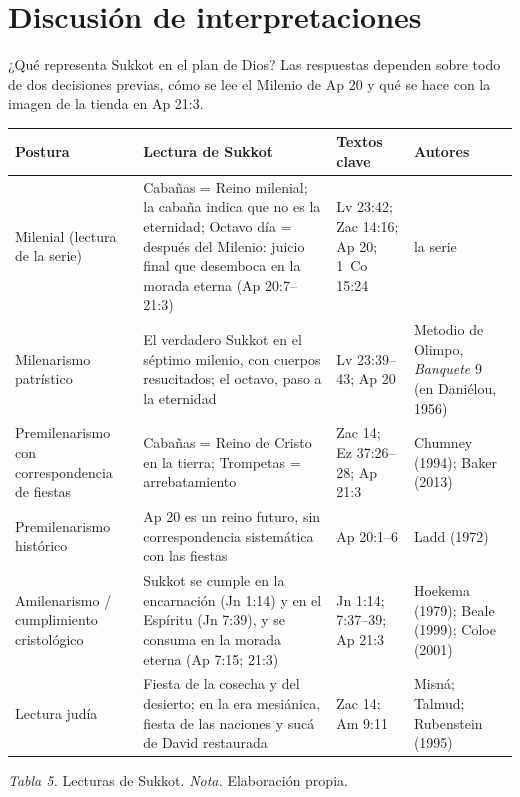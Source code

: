 \documentclass[11pt,letterpaper]{article}
\begin{document}
\section{Discusión de interpretaciones}

¿Qué representa Sukkot en el plan de Dios? Las respuestas dependen sobre todo de dos decisiones previas, cómo se lee el Milenio de Ap 20 y qué se hace con la imagen de la tienda en Ap 21:3.

\begin{center}\small\renewcommand{\arraystretch}{1.22}
\begin{tabular}{@{}L{3.0cm}L{5.2cm}L{3.2cm}L{3.0cm}@{}}
\toprule
\textbf{Postura} & \textbf{Lectura de Sukkot} & \textbf{Textos clave} & \textbf{Autores} \\ \midrule
Milenial (lectura de la serie) & Cabañas = Reino milenial; la cabaña indica que no es la eternidad; Octavo día = después del Milenio: juicio final que desemboca en la morada eterna (Ap 20:7--21:3) & Lv 23:42; Zac 14:16; Ap 20; 1~Co 15:24 & la serie \\
Milenarismo patrístico & El verdadero Sukkot en el séptimo milenio, con cuerpos resucitados; el octavo, paso a la eternidad & Lv 23:39--43; Ap 20 & Metodio de Olimpo, \emph{Banquete} 9 (en Daniélou, 1956) \\
Premilenarismo con correspondencia de fiestas & Cabañas = Reino de Cristo en la tierra; Trompetas = arrebatamiento & Zac 14; Ez 37:26--28; Ap 21:3 & Chumney (1994); Baker (2013) \\
Premilenarismo histórico & Ap 20 es un reino futuro, sin correspondencia sistemática con las fiestas & Ap 20:1--6 & Ladd (1972) \\
Amilenarismo / cumplimiento cristológico & Sukkot se cumple en la encarnación (Jn 1:14) y en el Espíritu (Jn 7:39), y se consuma en la morada eterna (Ap 7:15; 21:3) & Jn 1:14; 7:37--39; Ap 21:3 & Hoekema (1979); Beale (1999); Coloe (2001) \\
Lectura judía & Fiesta de la cosecha y del desierto; en la era mesiánica, fiesta de las naciones y sucá de David restaurada & Zac 14; Am 9:11 & Misná; Talmud; Rubenstein (1995) \\
\bottomrule
\end{tabular}\par
{\footnotesize\color{sepia}\textit{Tabla 5.} Lecturas de Sukkot. \textit{Nota.} Elaboración propia.}
\end{center}
\end{document}
